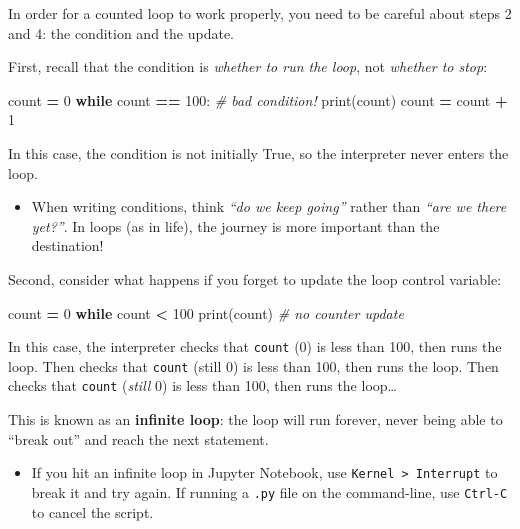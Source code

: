 \documentclass[]{book}
\newenvironment{Shaded}{\begin{snugshade}}{\end{snugshade}}
\newcommand{\DecValTok}[1]{\textcolor[rgb]{0.00,0.00,0.81}{#1}}
\newcommand{\CommentTok}[1]{\textcolor[rgb]{0.56,0.35,0.01}{\textit{#1}}}
\newcommand{\ControlFlowTok}[1]{\textcolor[rgb]{0.13,0.29,0.53}{\textbf{#1}}}
\newcommand{\OperatorTok}[1]{\textcolor[rgb]{0.81,0.36,0.00}{\textbf{#1}}}
\newcommand{\BuiltInTok}[1]{#1}
\newcommand{\NormalTok}[1]{#1}
\providecommand{\tightlist}{%
  \setlength{\itemsep}{0pt}\setlength{\parskip}{0pt}}
\begin{document}
In order for a counted loop to work properly, you need to be careful
about steps 2 and 4: the condition and the update.

First, recall that the condition is \emph{whether to run the loop}, not
\emph{whether to stop}:

\begin{Shaded}
\begin{Highlighting}[]
\NormalTok{count }\OperatorTok{=} \DecValTok{0}
\ControlFlowTok{while}\NormalTok{ count }\OperatorTok{==} \DecValTok{100}\NormalTok{:  }\CommentTok{# bad condition!}
    \BuiltInTok{print}\NormalTok{(count)}
\NormalTok{    count }\OperatorTok{=}\NormalTok{ count }\OperatorTok{+} \DecValTok{1}
\end{Highlighting}
\end{Shaded}

In this case, the condition is not initially True, so the interpreter
never enters the loop.

\begin{itemize}
\tightlist
\item
  When writing conditions, think \emph{``do we keep going''} rather than
  \emph{``are we there yet?''}. In loops (as in life), the journey is
  more important than the destination!
\end{itemize}

Second, consider what happens if you forget to update the loop control
variable:

\begin{Shaded}
\begin{Highlighting}[]
\NormalTok{count }\OperatorTok{=} \DecValTok{0}
\ControlFlowTok{while}\NormalTok{ count }\OperatorTok{<} \DecValTok{100}
    \BuiltInTok{print}\NormalTok{(count)}
    \CommentTok{# no counter update}
\end{Highlighting}
\end{Shaded}

In this case, the interpreter checks that \texttt{count} (0) is less
than 100, then runs the loop. Then checks that \texttt{count} (still 0)
is less than 100, then runs the loop. Then checks that \texttt{count}
(\emph{still} 0) is less than 100, then runs the loop\ldots{}

This is known as an \textbf{infinite loop}: the loop will run forever,
never being able to ``break out'' and reach the next statement.

\begin{itemize}
\tightlist
\item
  If you hit an infinite loop in Jupyter Notebook, use
  \texttt{Kernel\ \textgreater{}\ Interrupt} to break it and try again.
  If running a \texttt{.py} file on the command-line, use
  \texttt{Ctrl-C} to cancel the script.
\end{itemize}
\end{document}

